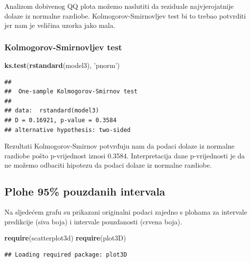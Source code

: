 \documentclass[]{article}
\newenvironment{Shaded}{\begin{snugshade}}{\end{snugshade}}
\newcommand{\KeywordTok}[1]{\textcolor[rgb]{0.13,0.29,0.53}{\textbf{{#1}}}}
\newcommand{\StringTok}[1]{\textcolor[rgb]{0.31,0.60,0.02}{{#1}}}
\newcommand{\NormalTok}[1]{{#1}}
\begin{document}
Analizom dobivenog QQ plota možemo naslutiti da reziduale
najvjerojatnije dolaze iz normalne razdiobe. Kolmogorov-Smirnovljev test
bi to trebao potvrditi jer nam je veličina uzorka jako mala.

\subsubsection{Kolmogorov-Smirnovljev
test}\label{kolmogorov-smirnovljev-test-3}

\begin{Shaded}
\begin{Highlighting}[]
\KeywordTok{ks.test}\NormalTok{(}\KeywordTok{rstandard}\NormalTok{(model3), }\StringTok{'pnorm'}\NormalTok{)}
\end{Highlighting}
\end{Shaded}

\begin{verbatim}
## 
##  One-sample Kolmogorov-Smirnov test
## 
## data:  rstandard(model3)
## D = 0.16921, p-value = 0.3584
## alternative hypothesis: two-sided
\end{verbatim}

Rezultati Kolmogorov-Smirnov potvrđuju nam da podaci dolaze iz normalne
razdiobe pošto p-vrijednost iznosi 0.3584. Interpretacija dane
p-vrijednosti je da ne možemo odbaciti hipotezu da podaci dolaze iz
normalne razdiobe.

\subsection{Plohe 95\% pouzdanih
intervala}\label{plohe-95-pouzdanih-intervala}

Na sljedećem grafu su prikazani originalni podaci zajedno s plohama za
intervale predikcije (siva boja) i intervale pouzdanosti (crvena boja).

\begin{Shaded}
\begin{Highlighting}[]
\KeywordTok{require}\NormalTok{(scatterplot3d)}
\KeywordTok{require}\NormalTok{(plot3D)}
\end{Highlighting}
\end{Shaded}

\begin{verbatim}
## Loading required package: plot3D
\end{verbatim}
\end{document}
